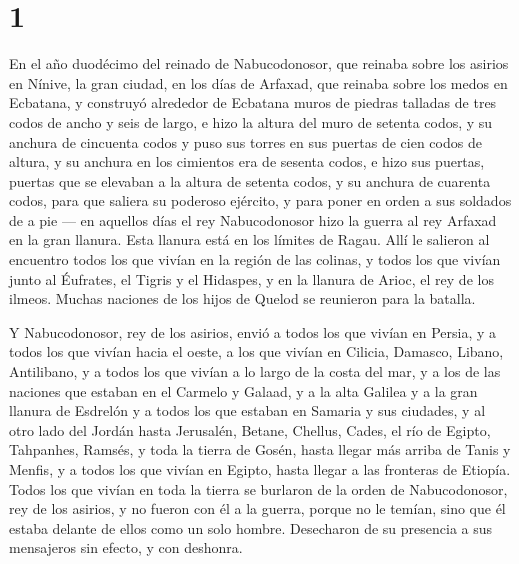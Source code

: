 \hypertarget{section}{%
\section{1}\label{section}}

 En el año duodécimo del reinado de Nabucodonosor, que
reinaba sobre los asirios en Nínive, la gran ciudad, en los días de
Arfaxad, que reinaba sobre los medos en Ecbatana,  y
construyó alrededor de Ecbatana muros de piedras talladas de tres codos
de ancho y seis de largo, e hizo la altura del muro de setenta codos, y
su anchura de cincuenta codos  y puso sus torres en sus
puertas de cien codos de altura, y su anchura en los cimientos era de
sesenta codos,  e hizo sus puertas, puertas que se
elevaban a la altura de setenta codos, y su anchura de cuarenta codos,
para que saliera su poderoso ejército, y para poner en orden a sus
soldados de a pie ---  en aquellos días el rey
Nabucodonosor hizo la guerra al rey Arfaxad en la gran llanura. Esta
llanura está en los límites de Ragau.  Allí le salieron al
encuentro todos los que vivían en la región de las colinas, y todos los
que vivían junto al Éufrates, el Tigris y el Hidaspes, y en la llanura
de Arioc, el rey de los ilmeos. Muchas naciones de los hijos de Quelod
se reunieron para la batalla.

 Y Nabucodonosor, rey de los asirios, envió a todos los
que vivían en Persia, y a todos los que vivían hacia el oeste, a los que
vivían en Cilicia, Damasco, Libano, Antilibano, y a todos los que vivían
a lo largo de la costa del mar,  y a los de las naciones
que estaban en el Carmelo y Galaad, y a la alta Galilea y a la gran
llanura de Esdrelón  y a todos los que estaban en Samaria
y sus ciudades, y al otro lado del Jordán hasta Jerusalén, Betane,
Chellus, Cades, el río de Egipto, Tahpanhes, Ramsés, y toda la tierra de
Gosén,  hasta llegar más arriba de Tanis y Menfis, y a
todos los que vivían en Egipto, hasta llegar a las fronteras de Etiopía.
 Todos los que vivían en toda la tierra se burlaron de la
orden de Nabucodonosor, rey de los asirios, y no fueron con él a la
guerra, porque no le temían, sino que él estaba delante de ellos como un
solo hombre. Desecharon de su presencia a sus mensajeros sin efecto, y
con deshonra.

